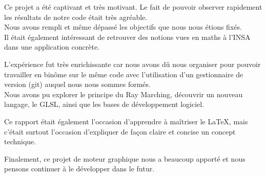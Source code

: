 
Ce projet a été captivant et très motivant. Le fait de pouvoir observer rapidement les résultats de notre code était très agréable.\\
Nous avons rempli et même dépassé les objectifs que nous nous étions fixés.\\
Il était également intéressant de retrouver des notions vues en maths à l'INSA dans une application concrète.\\ \par

L'expérience fut très enrichissante car nous avons dû nous organiser pour pouvoir travailler en binôme sur le même code avec l'utilisation d'un gestionnaire de version (git) auquel nous nous sommes formés.\\
Nous avons pu explorer le principe du Ray Marching, découvrir un nouveau langage, le GLSL, ainsi que les bases de développement logiciel.\\ \par

Ce rapport était également l'occasion d'apprendre à maîtriser le LaTeX, mais c'était surtout l'occasion d'expliquer de façon claire et concise un concept technique.\\ \par

Finalement, ce projet de moteur graphique nous a beaucoup apporté et nous pensons continuer à le développer dans le futur.